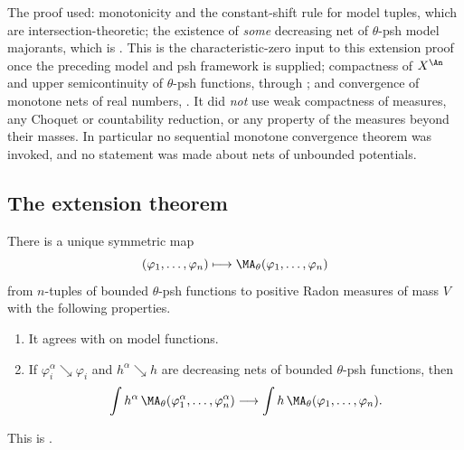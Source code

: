 \begin{remark}
\label{rem:ch24-energy-extension-audit}
The proof used: monotonicity and the constant-shift rule for model tuples,
which are intersection-theoretic; the existence of \emph{some} decreasing
net of $\theta$-psh model majorants, which is
.  This is the
characteristic-zero input to this extension proof once the preceding model
and psh framework is supplied; compactness of $X^{\An}$ and upper
semicontinuity of $\theta$-psh functions, through
; and convergence of monotone nets of real numbers,
.  It did \emph{not} use weak compactness
of measures, any Choquet or countability reduction, or any property of the
measures beyond their masses.  In particular no sequential monotone
convergence theorem was invoked, and no statement was made about nets of
unbounded potentials.
\end{remark}

\subsection{The extension theorem}
\label{sec:ch24-extension-theorem}

\begin{theorem}\label{thm:bounded-ma-extension}
There is a unique symmetric map
\[
 (\varphi_1,\ldots,\varphi_n)\longmapsto
 \MA_\theta(\varphi_1,\ldots,\varphi_n)
\]
from $n$-tuples of bounded $\theta$-psh functions to positive Radon
measures of mass $V$ with the following properties.
\begin{enumerate}
\item It agrees with  on model
functions.
\item If $\varphi_i^\alpha\searrow\varphi_i$ and
$h^\alpha\searrow h$ are decreasing nets of bounded
$\theta$-psh functions, then
\begin{equation}
\label{eq:weighted-monotone-ma}
 \int h^\alpha\,
   \MA_\theta(\varphi_1^\alpha,\ldots,\varphi_n^\alpha)
 \longrightarrow
 \int h\,\MA_\theta(\varphi_1,\ldots,\varphi_n).
\end{equation}
\end{enumerate}
This is \cite[Theorem~3.1]{BFJ15}.
\end{theorem}

